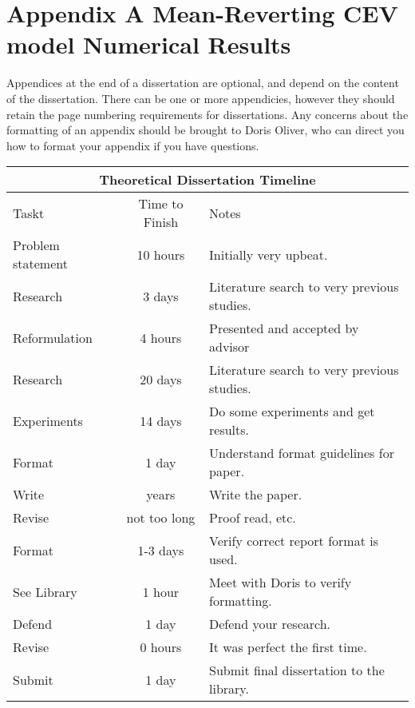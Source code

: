 \chapter{Appendix A Mean-Reverting CEV model Numerical Results}
\label{mrcev}
\noindent Appendices at the end of a dissertation are optional, and depend on the content of the dissertation. There can be one or more appendicies, however they should retain the page numbering requirements for dissertations.  Any concerns about the formatting of an appendix should be brought to Doris Oliver, who can direct you how to format your appendix if you have questions.

\begin{center}
\begin{tabular}{|l|c|p{3.0in}|}
\hline
\multicolumn{3}{|c|}{Theoretical Dissertation Timeline}\\ \hline
Taskt&Time to Finish&Notes\\ \hline
Problem statement&10 hours&Initially very upbeat.\\ \hline
Research&3 days&Literature search to very previous studies.\\ \hline
Reformulation&4 hours&Presented and accepted by advisor\\ \hline
Research&20 days&Literature search to very previous  studies.\\ \hline
Experiments&14 days&Do some experiments and get results.\\ \hline
Format&1 day&Understand format guidelines for paper.\\ \hline
Write&years&Write the paper.\\ \hline
Revise&not too long&Proof read, etc.\\ \hline
Format&1-3 days&Verify correct report format is used.\\ \hline
See Library&1 hour&Meet with Doris to verify formatting.\\ \hline
Defend&1 day&Defend your research.\\ \hline
Revise&0 hours&It was perfect the first time.\\ \hline
Submit&1 day&Submit final dissertation to the library.\\ \hline
\end{tabular}
\end{center} 

